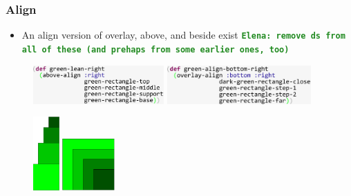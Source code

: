 \documentclass{beamer}
\newcommand{\comment}[1]{{\bf \tt  {#1}}}
\newcommand{\emcomment}[1]{\textcolor{ForestGreen}{\comment{Elena: {#1}}}}
\begin{document}
\begin{frame}
\frametitle{Align}
	\begin{itemize}
		\item An align version of overlay, above, and beside exist \emcomment{remove ds from all of these (and prehaps from some earlier ones, too)}
	\end{itemize}
		\begin{figure}
		\includegraphics[width=5cm]{PresentationImages/greenLeanRightCode.pdf}
		\hspace{0.1cm}
		\includegraphics[width=5.5cm]{PresentationImages/greenAlignBottomRightCode.pdf}
	\end{figure}

	\begin{figure}
		\includegraphics[width=1.0cm]{PresentationImages/greenLeanRight.png}
		\hspace{4cm} 	\vspace{0.3cm}
		\includegraphics[width=2cm]{PresentationImages/greenAlignBottomRight.png}
	\end{figure}
\end{frame}
\end{document}
